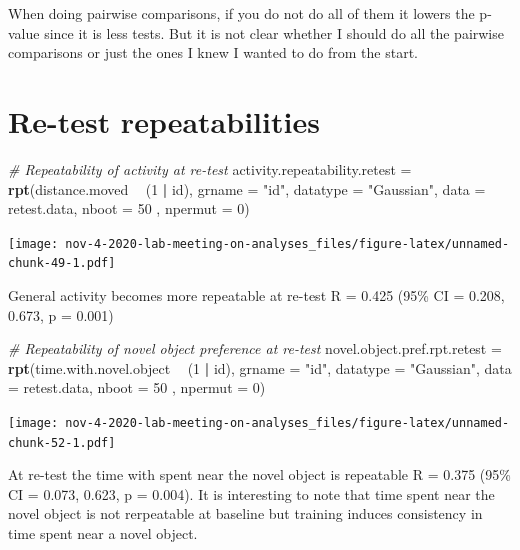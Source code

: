 \documentclass[]{book}
\newenvironment{Shaded}{\begin{snugshade}}{\end{snugshade}}
\newcommand{\KeywordTok}[1]{\textcolor[rgb]{0.13,0.29,0.53}{\textbf{#1}}}
\newcommand{\DataTypeTok}[1]{\textcolor[rgb]{0.13,0.29,0.53}{#1}}
\newcommand{\DecValTok}[1]{\textcolor[rgb]{0.00,0.00,0.81}{#1}}
\newcommand{\StringTok}[1]{\textcolor[rgb]{0.31,0.60,0.02}{#1}}
\newcommand{\CommentTok}[1]{\textcolor[rgb]{0.56,0.35,0.01}{\textit{#1}}}
\newcommand{\OperatorTok}[1]{\textcolor[rgb]{0.81,0.36,0.00}{\textbf{#1}}}
\newcommand{\NormalTok}[1]{#1}
\begin{document}
When doing pairwise comparisons, if you do not do all of them it lowers
the p-value since it is less tests. But it is not clear whether I should
do all the pairwise comparisons or just the ones I knew I wanted to do
from the start.

\chapter{Re-test repeatabilities}\label{re-test-repeatabilities}

\begin{Shaded}
\begin{Highlighting}[]
\CommentTok{# Repeatability of activity at re-test }
\NormalTok{activity.repeatability.retest =}\StringTok{ }
\StringTok{  }\KeywordTok{rpt}\NormalTok{(distance.moved }\OperatorTok{~}\StringTok{ }\NormalTok{(}\DecValTok{1} \OperatorTok{|}\StringTok{ }\NormalTok{id), }\DataTypeTok{grname =} \StringTok{"id"}\NormalTok{, }\DataTypeTok{datatype =} \StringTok{"Gaussian"}\NormalTok{, }
      \DataTypeTok{data =}\NormalTok{ retest.data, }\DataTypeTok{nboot =} \DecValTok{50}\NormalTok{ , }\DataTypeTok{npermut =} \DecValTok{0}\NormalTok{) }
\end{Highlighting}
\end{Shaded}

\texttt{[image: nov-4-2020-lab-meeting-on-analyses\_files/figure-latex/unnamed-chunk-49-1.pdf]}

General activity becomes more repeatable at re-test R = 0.425 (95\% CI =
0.208, 0.673, p = 0.001)

\begin{Shaded}
\begin{Highlighting}[]
\CommentTok{# Repeatability of novel object preference at re-test }
\NormalTok{novel.object.pref.rpt.retest =}\StringTok{ }
\StringTok{  }\KeywordTok{rpt}\NormalTok{(time.with.novel.object }\OperatorTok{~}\StringTok{ }\NormalTok{(}\DecValTok{1} \OperatorTok{|}\StringTok{ }\NormalTok{id), }\DataTypeTok{grname =} \StringTok{"id"}\NormalTok{, }\DataTypeTok{datatype =} \StringTok{"Gaussian"}\NormalTok{, }
      \DataTypeTok{data =}\NormalTok{ retest.data, }\DataTypeTok{nboot =} \DecValTok{50}\NormalTok{ , }\DataTypeTok{npermut =} \DecValTok{0}\NormalTok{) }
\end{Highlighting}
\end{Shaded}

\texttt{[image: nov-4-2020-lab-meeting-on-analyses\_files/figure-latex/unnamed-chunk-52-1.pdf]}

At re-test the time with spent near the novel object is repeatable R =
0.375 (95\% CI = 0.073, 0.623, p = 0.004). It is interesting to note
that time spent near the novel object is not rerpeatable at baseline but
training induces consistency in time spent near a novel object.
\end{document}
